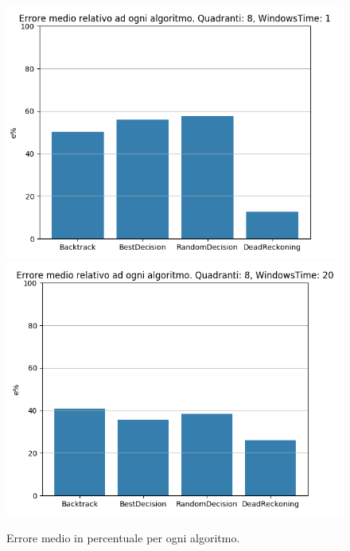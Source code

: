 \documentclass[12pt,a4paper,openright,twoside]{report}
\begin{document}
\begin{figure}[H]
\centering 
\includegraphics[scale=0.4]{secondChart8-1} 
\includegraphics[scale=0.4]{secondChart8-20} 
\caption{Errore medio in percentuale per ogni algoritmo.} 

\end{figure}
\end{document}
